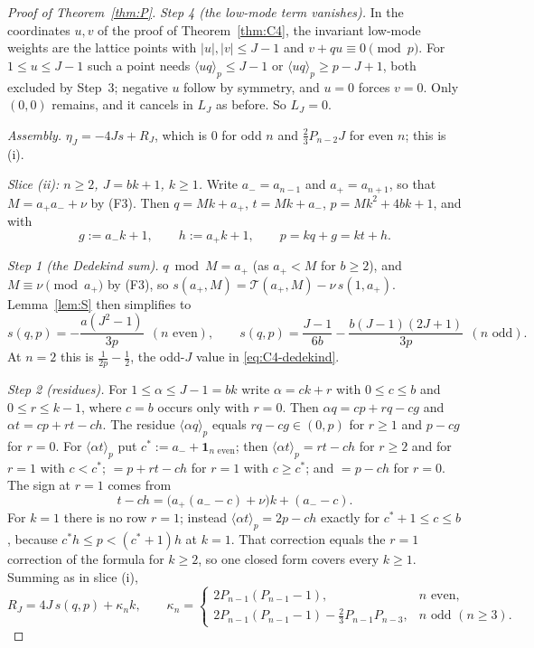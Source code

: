 \documentclass[11pt]{article}
\theoremstyle{definition}
\newcommand{\ind}{\mathbf 1}
\begin{document}
\begin{proof}[Proof of Theorem~\ref{thm:P}]
\emph{Step 4 (the low-mode term vanishes).}  In the coordinates $u,v$ of
the proof of Theorem~\ref{thm:C4}, the invariant low-mode weights are the
lattice points with $|u|,|v|\leq J-1$ and $v+qu\equiv0\pmod p$.  For
$1\leq u\leq J-1$ such a point needs $\langle uq\rangle_p\leq J-1$ or
$\langle uq\rangle_p\geq p-J+1$, both excluded by Step~3; negative $u$
follow by symmetry, and $u=0$ forces $v=0$.  Only $(0,0)$ remains, and it
cancels in $L_J$ as before.  So $L_J=0$.

\emph{Assembly.}  $\eta_J=-4Js+R_J$, which is $0$ for odd $n$ and
$\frac23P_{n-2}J$ for even $n$; this is (i).

\medskip\noindent\emph{Slice (ii): $n\geq2$, $J=bk+1$, $k\geq1$.}  Write
$a_-=a_{n-1}$ and $a_+=a_{n+1}$, so that $M=a_+a_-+\nu$ by (F3).  Then
$q=Mk+a_+$, $t=Mk+a_-$, $p=Mk^2+4bk+1$, and with
\[
 g:=a_-k+1,\qquad h:=a_+k+1,\qquad p=kq+g=kt+h .
\]

\emph{Step 1 (the Dedekind sum).}  $q\bmod M=a_+$ (as $a_+<M$ for
$b\geq2$), and $M\equiv\nu\pmod{a_+}$ by (F3), so
$s(a_+,M)=\mathcal T(a_+,M)-\nu\,s(1,a_+)$.  Lemma~\ref{lem:S} then
simplifies to
\begin{equation}
 s(q,p)=-\frac{a(J^2-1)}{3p}\ \ (n\text{ even}),\qquad
 s(q,p)=\frac{J-1}{6b}-\frac{b(J-1)(2J+1)}{3p}\ \ (n\text{ odd}).
 \label{eq:P-ii-dedekind}
\end{equation}
At $n=2$ this is $\frac1{2p}-\frac12$, the odd-$J$ value in
\eqref{eq:C4-dedekind}.

\emph{Step 2 (residues).}  For $1\leq\alpha\leq J-1=bk$ write
$\alpha=ck+r$ with $0\leq c\leq b$ and $0\leq r\leq k-1$, where $c=b$
occurs only with $r=0$.  Then $\alpha q=cp+rq-cg$ and
$\alpha t=cp+rt-ch$.  The residue $\langle\alpha q\rangle_p$ equals
$rq-cg\in(0,p)$ for $r\geq1$ and $p-cg$ for $r=0$.  For
$\langle\alpha t\rangle_p$ put $c^*:=a_-+\ind_{n\text{ even}}$; then
$\langle\alpha t\rangle_p=rt-ch$ for $r\geq2$ and for $r=1$ with $c<c^*$;
$=p+rt-ch$ for $r=1$ with $c\geq c^*$; and $=p-ch$ for $r=0$.  The sign
at $r=1$ comes from
\[
 t-ch=\bigl(a_+(a_--c)+\nu\bigr)k+(a_--c) .
\]
For $k=1$ there is no row $r=1$; instead $\langle\alpha t\rangle_p=2p-ch$
exactly for $c^*+1\leq c\leq b$, because $c^*h\leq p<(c^*+1)h$ at $k=1$.
That correction equals the $r=1$ correction of the formula for $k\geq2$,
so one closed form covers every $k\geq1$.  Summing as in slice (i),
\begin{equation}
 R_J=4J\,s(q,p)+\kappa_nk,\qquad
 \kappa_n=\begin{cases}
 2P_{n-1}(P_{n-1}-1),&n\text{ even},\\
 2P_{n-1}(P_{n-1}-1)-\tfrac23P_{n-1}P_{n-3},&n\text{ odd }(n\geq3).
 \end{cases}
 \label{eq:P-ii-residue}
\end{equation}


\end{proof}
\end{document}
